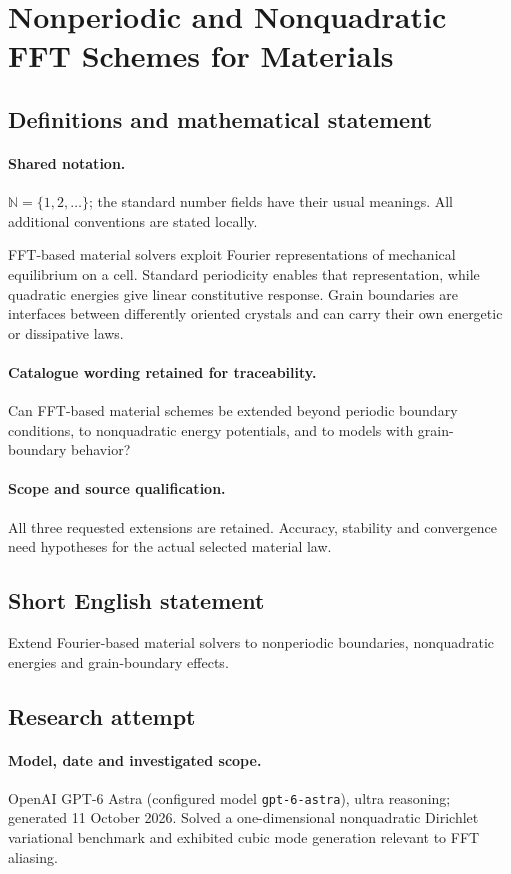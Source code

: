 \documentclass[11pt]{article}
\begin{document}
\section{Nonperiodic and Nonquadratic FFT Schemes for Materials}\label{statement}

\subsection{Definitions and mathematical statement}

\paragraph{Shared notation.}$\mathbb N=\{1,2,\ldots\}$; the standard number fields have their usual meanings. All additional conventions are stated locally.


FFT-based material solvers exploit Fourier representations of mechanical equilibrium on a cell. Standard periodicity enables that representation, while quadratic energies give linear constitutive response. Grain boundaries are interfaces between differently oriented crystals and can carry their own energetic or dissipative laws.

\paragraph{Catalogue wording retained for traceability.}
Can FFT-based material schemes be extended beyond periodic boundary conditions, to nonquadratic energy potentials, and to models with grain-boundary behavior?

\paragraph{Scope and source qualification.}All three requested extensions are retained. Accuracy, stability and convergence need hypotheses for the actual selected material law.
\subsection{Short English statement}
Extend Fourier-based material solvers to nonperiodic boundaries, nonquadratic energies and grain-boundary effects.
\subsection{Research attempt}
\paragraph{Model, date and investigated scope.}
OpenAI GPT-6 Astra (configured model \texttt{gpt-6-astra}), ultra reasoning; generated 11 October 2026. Solved a one-dimensional nonquadratic Dirichlet variational benchmark and exhibited cubic mode generation relevant to FFT aliasing.
\end{document}
